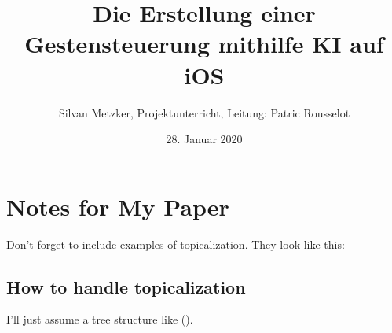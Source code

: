 \documentclass[12pt]{article}
\begin{document}
\title{Die Erstellung einer Gestensteuerung mithilfe KI auf iOS}
\date{28. Januar 2020}
\author{Silvan Metzker, Projektunterricht, Leitung: Patric Rousselot}
\maketitle


\section*{Notes for My Paper}

Don't forget to include examples of topicalization.
They look like this:

\subsection*{How to handle topicalization}

I'll just assume a tree structure like ().
\end{document}
